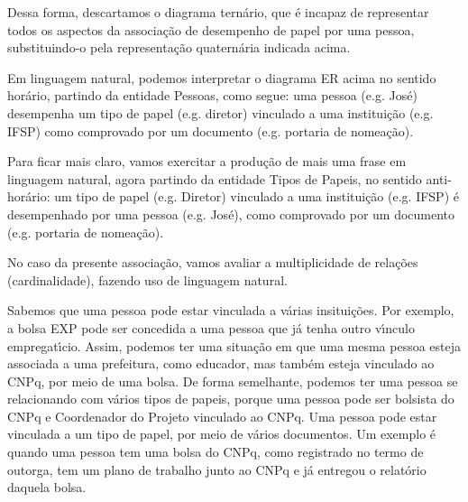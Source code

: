 \documentclass[
12pt,		%
openright,	%
twoside,  %
a4paper,			%
chapter=TITLE,		%
english,			%
french,				%
spanish,			%
brazil				%
]{USPSC-classe/USPSC}
\begin{document}
Dessa forma, descartamos o diagrama tern\'ario, que \'e incapaz de representar todos os aspectos da associa\c{c}\~ao de desempenho de papel por uma pessoa, substituindo-o pela representa\c{c}\~ao quatern\'aria indicada acima.










Em linguagem natural, podemos interpretar o diagrama ER acima no sentido hor\'ario, partindo da entidade \textquotedbl Pessoas\textquotedbl , como segue: uma pessoa (e.g. Jos\'e) desempenha um tipo de papel (e.g. diretor) vinculado a uma institui\c{c}\~ao (e.g. IFSP) como comprovado por um documento (e.g. portaria de nomea\c{c}\~ao).










Para ficar mais claro, vamos exercitar a produ\c{c}\~ao de mais uma frase em linguagem natural, agora partindo da entidade \textquotedbl Tipos de Papeis\textquotedbl , no sentido anti-hor\'ario: um tipo de papel (e.g. Diretor) vinculado a uma institui\c{c}\~ao (e.g. IFSP) \'e desempenhado por uma pessoa (e.g. Jos\'e), como comprovado por um documento (e.g. portaria de nomea\c{c}\~ao).










No caso da presente associa\c{c}\~ao, vamos avaliar a multiplicidade de rela\c{c}\~oes (cardinalidade), fazendo uso de linguagem natural.










Sabemos que uma pessoa pode estar vinculada a v\'arias insitui\c{c}\~oes. Por exemplo, a bolsa EXP pode ser concedida a uma pessoa que j\'a tenha outro v\'{\i}nculo empregat\'{\i}cio. Assim, podemos ter uma situa\c{c}\~ao em que uma mesma pessoa esteja associada a uma prefeitura, como educador, mas tamb\'em esteja vinculado ao CNPq, por meio de uma bolsa. De forma semelhante, podemos ter uma pessoa se relacionando com v\'arios tipos de papeis, porque uma pessoa pode ser bolsista do CNPq e Coordenador do Projeto vinculado ao CNPq. Uma pessoa pode estar vinculada a um tipo de papel, por meio de v\'arios documentos. Um exemplo \'e quando uma pessoa tem uma bolsa do CNPq, como registrado no termo de outorga, tem um plano de trabalho junto ao CNPq e j\'a entregou o relat\'orio daquela bolsa.
\end{document}
